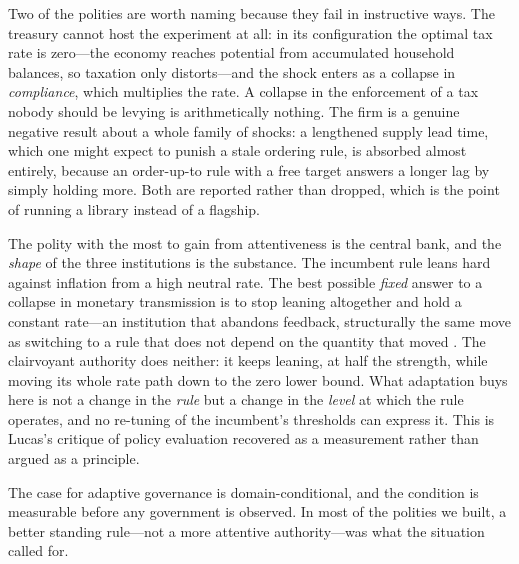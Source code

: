 \documentclass[11pt]{article}
\begin{document}
Two of the polities are worth naming because they fail in instructive ways. The treasury cannot host
the experiment at all: in its configuration the optimal tax rate is zero---the economy reaches
potential from accumulated household balances, so taxation only distorts---and the shock enters as a
collapse in \emph{compliance}, which multiplies the rate. A collapse in the enforcement of a tax
nobody should be levying is arithmetically nothing. The firm is a genuine negative result about a
whole family of shocks: a lengthened supply lead time, which one might expect to punish a stale
ordering rule, is absorbed almost entirely, because an order-up-to rule with a free target answers a
longer lag by simply holding more. Both are reported rather than dropped, which is the point of
running a library instead of a flagship.

The polity with the most to gain from attentiveness is the central bank, and the \emph{shape} of the
three institutions is the substance. The incumbent rule leans hard against inflation from a high
neutral rate. The best possible \emph{fixed} answer to a collapse in monetary transmission is to stop
leaning altogether and hold a constant rate---an institution that abandons feedback, structurally the
same move as switching to a rule that does not depend on the quantity that moved
\citep{orphanides2002robust}. The clairvoyant
authority does neither: it keeps leaning, at half the strength, while moving its whole rate path down
to the zero lower bound. What adaptation buys here is not a change in the \emph{rule} but a change in
the \emph{level} at which the rule operates, and no re-tuning of the incumbent's thresholds can
express it. This is Lucas's critique of policy evaluation \citep{lucas1976critique} recovered as a
measurement rather than argued as a principle.

\begin{takeaway}
The case for adaptive governance is domain-conditional, and the condition is measurable before any
government is observed. In most of the polities we built, a better standing rule---not a more
attentive authority---was what the situation called for.
\end{takeaway}
\end{document}
